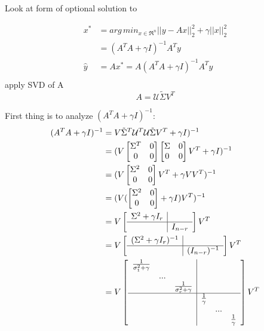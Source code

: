 Look at form of optional solution to 

\begin{align*}
x^* &= arg\,min_{x\in \Re^n}||y-Ax||_2^2 + \gamma||x||^2_2\\
&= (A^TA + \gamma I)^{-1}A^Ty\\
\hat{y}&= Ax^* = A(A^TA + \gamma I)^{-1}A^Ty\\
\end{align*}
apply SVD of A
\begin{equation*}
A = \mathcal{U}\tilde{\Sigma}V^T
\end{equation*}

First thing is to analyze $(A^TA + \gamma I)^{-1}$:
\begin{align*}
(A^TA + \gamma I)^{-1} &= V\tilde{\Sigma}^T\mathcal{U}^T\mathcal{U}\tilde{\Sigma}V^T + \gamma I)^{-1}\\
&= (V
\begin{bmatrix}
\Sigma^T & 0\\
0 & 0\\
\end{bmatrix}
\begin{bmatrix}
\Sigma & 0\\
0 & 0\\
\end{bmatrix}
V^T + \gamma I)^{-1}\\
&=(V
\begin{bmatrix}
\Sigma^2 & 0\\
0  & 0
\end{bmatrix}
V^T + \gamma VV^T
)^{-1}\\
&= (V(
\begin{bmatrix}
\Sigma^2 & 0\\
0 & 0
\end{bmatrix}
+\gamma I)V^T)^{-1}\\
&= V
\left[
\begin{array}{c|c}
\Sigma^2+\gamma I_r&  \\ \hline 
& I_{n-r}
\end{array}
\right]
V^T\\
&=
V
\left[
\begin{array}{c|c}
(\Sigma^2+\gamma I_r)^{-1}&  \\ \hline 
& (I_{n-r})^{-1}
\end{array}
\right]
V^T\\
&=
V
\left[
\begin{array}{c|c}
\begin{matrix}
\frac{1}{\sigma_1^2+\gamma} & &\\
&...&\\
&&\frac{1}{\sigma_r^2+\gamma}
\end{matrix}&  \\ \hline 
& \begin{matrix}
\frac{1}{\gamma} & &\\
&...&\\
&&\frac{1}{\gamma}
\end{matrix}
\end{array}
\right]
V^T
\end{align*}

